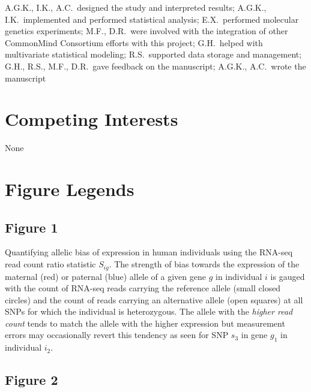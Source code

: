 \documentclass[letterpaper]{article}
\begin{document}
A.G.K., I.K., A.C.~designed the study and interpreted results;  A.G.K.,
I.K.~implemented and performed statistical analysis; E.X.~performed molecular
genetics experiments; M.F., D.R.~were involved with the integration of other
CommonMind Consortium efforts with this project; G.H.~helped with multivariate
statistical modeling; R.S.~supported data storage and management; G.H., R.S.,
M.F., D.R.~gave feedback on the manuscript; A.G.K., A.C.~wrote the manuscript

\section*{Competing Interests}

None

\section*{Figure Legends}

\subsection*{Figure 1}

Quantifying allelic bias of expression in human
individuals using the RNA-seq read count ratio statistic \(S_{ig}\).
The strength of
bias towards the expression of the maternal (red) or paternal (blue) allele of
a given gene \(g\) in individual \(i\) is gauged with the count of RNA-seq
reads carrying the reference allele (small closed circles) and the count of
reads carrying an alternative allele (open squares) at all SNPs for which the
individual is heterozygous.  The allele with the \emph{higher read count} tends to
match the allele with the higher expression but measurement errors may
occasionally revert this tendency as seen for SNP \(s_3\) in gene \(g_1\) in
individual \(i_2\).


\subsection*{Figure 2}
\end{document}
